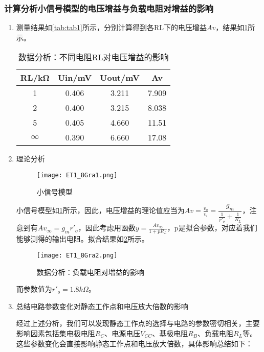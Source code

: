 \documentclass[dvipsnames, svgnames,a4paper,11pt]{article}
\begin{document}
	\subsubsection{计算分析小信号模型的电压增益与负载电阻对增益的影响}
	\begin{enumerate}
		\item 测量结果如\cref{tab:tab1}所示，分别计算得到各RL下的电压增益$Av$，结果如\cref{tab:tab4}所示。
		
		\begin{table}[h]
			\centering
			\caption{数据分析：不同电阻RL对电压增益的影响}
			\label{tab:tab4}
			\begin{tabular}{|c|c|c|c|}
				\hline
				RL/kΩ & Uin/mV & Uout/mV & Av \\
				\hline
				1 & 0.406 & 3.211 & 7.909 \\
				2 & 0.400 & 3.215 & 8.038 \\
				5 & 0.405 & 4.660 & 11.51 \\
				$\infty$ & 0.390 & 6.660 & 17.08 \\
				\hline
			\end{tabular}
		\end{table}
		
		\item 理论分析
		
		\begin{figure}[htbp]
			\centering
			\texttt{[image: ET1\_8Gra1.png]}
			\caption{小信号模型}
			\label{fig:fig1}
		\end{figure}
		
		小信号模型如\cref{fig:fig1}所示，因此，电压增益的理论值应当为$Av=\frac{v_o}{v_i}=\dfrac{g_m}{\frac{1}{r'_o}+\frac{1}{R_L}}$，注意到有$Av_{\infty}=g_mr'_o$，因此考虑用函数$y=\frac{Av_{\infty}}{1+pR_L}$，p是拟合参数，对应着我们能够测得的输出电阻。拟合结果如\cref{fig:fig2}所示。
		
		\begin{figure}[htbp]
			\centering
			\texttt{[image: ET1\_8Gra2.png]}
			\caption{数据分析：负载电阻对增益的影响}
			\label{fig:fig2}
		\end{figure}
		
		而参数值为$r'_o=1.8k\Omega$。
		
		\item 总结电路参数变化对静态工作点和电压放大倍数的影响

			经过上述分析，我们可以发现静态工作点的选择与电路的参数密切相关，主要影响因素包括集电极电阻$R_C$、电源电压$V_{CC}$、基极电阻$R_B$、负载电阻$R_L$等。这些参数变化会直接影响静态工作点和电压放大倍数，具体影响总结如下：


\end{enumerate}
\end{document}
